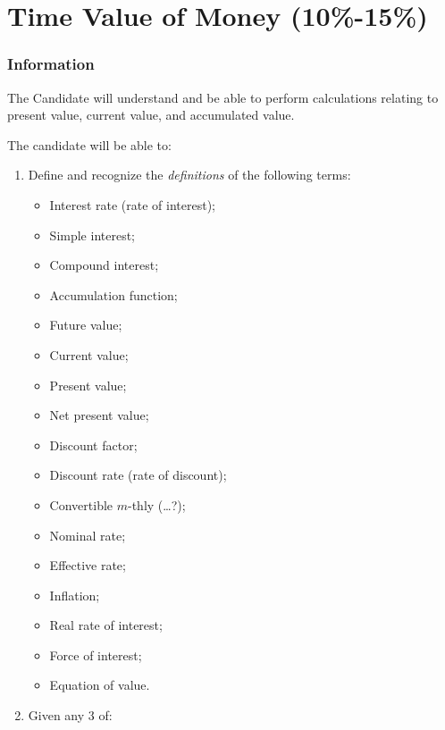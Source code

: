 \chapter[Time Value of Money]{Time Value of Money (10\%-15\%)}

\subsection{Information}

\begin{distributions}[Objective]
The Candidate will understand and be able to perform calculations relating to present value, current value, and accumulated value.
\end{distributions}

\begin{outcomes}
The candidate will be able to:
\begin{enumerate}[label = \alph*)]
	\item	Define and recognize the \textit{definitions} of the following terms:
		\begin{multicols*}{2}
		\begin{itemize}[leftmargin = *]
		\item	Interest rate (rate of interest);
		\item	Simple interest;
		\item	Compound interest;
		\item	Accumulation function;
		\item	Future value;
		\item	Current value;
		\item	Present value;
		\item	Net present value;
		\item	Discount factor;
		\item	Discount rate (rate of discount);
		\item	Convertible $m$-thly (\dots ?);
		\item	Nominal rate;
		\item	Effective rate;
		\item	Inflation;
		\item	Real rate of interest;
		\item	Force of interest;
		\item	Equation of value.
		\end{itemize}
		\end{multicols*}
	\item	Given any 3 of:
		\begin{multicols*}{3}

\end{multicols*}
\end{enumerate}
\end{outcomes}
